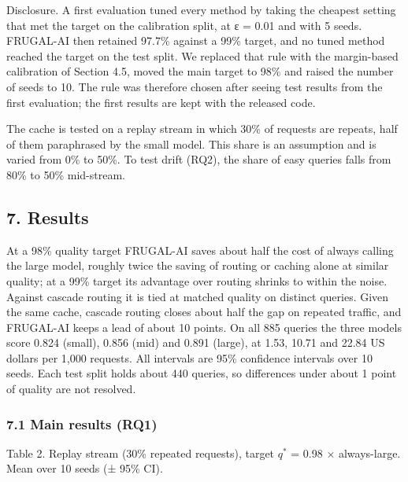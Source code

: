 \documentclass[
  10pt,
]{article}
\begin{document}
Disclosure. A first evaluation tuned every method by taking the cheapest
setting that met the target on the calibration split, at ε = 0.01 and
with 5 seeds. FRUGAL-AI then retained 97.7\% against a 99\% target, and
no tuned method reached the target on the test split. We replaced that
rule with the margin-based calibration of Section 4.5, moved the main
target to 98\% and raised the number of seeds to 10. The rule was
therefore chosen after seeing test results from the first evaluation;
the first results are kept with the released code.

The cache is tested on a replay stream in which 30\% of requests are
repeats, half of them paraphrased by the small model. This share is an
assumption and is varied from 0\% to 50\%. To test drift (RQ2), the
share of easy queries falls from 80\% to 50\% mid-stream.

\subsection{7. Results}\label{results}

At a 98\% quality target FRUGAL-AI saves about half the cost of always
calling the large model, roughly twice the saving of routing or caching
alone at similar quality; at a 99\% target its advantage over routing
shrinks to within the noise. Against cascade routing it is tied at
matched quality on distinct queries. Given the same cache, cascade
routing closes about half the gap on repeated traffic, and FRUGAL-AI
keeps a lead of about 10 points. On all 885 queries the three models
score 0.824 (small), 0.856 (mid) and 0.891 (large), at 1.53, 10.71 and
22.84 US dollars per 1,000 requests. All intervals are 95\% confidence
intervals over 10 seeds. Each test split holds about 440 queries, so
differences under about 1 point of quality are not resolved.

\subsubsection{7.1 Main results (RQ1)}\label{main-results-rq1}

Table 2. Replay stream (30\% repeated requests), target \(q^{*}\) = 0.98
× always-large. Mean over 10 seeds (± 95\% CI).
\end{document}
